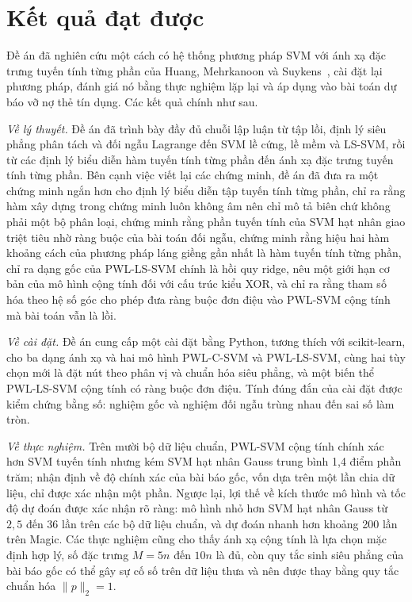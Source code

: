 
\section*{Kết quả đạt được}

Đề án đã nghiên cứu một cách có hệ thống phương pháp SVM với ánh xạ đặc trưng tuyến tính từng phần của Huang, Mehrkanoon và Suykens~\cite{huang2013}, cài đặt lại phương pháp, đánh giá nó bằng thực nghiệm lặp lại và áp dụng vào bài toán dự báo vỡ nợ thẻ tín dụng. Các kết quả chính như sau.

\emph{Về lý thuyết.} Đề án đã trình bày đầy đủ chuỗi lập luận từ tập lồi, định lý siêu phẳng phân tách và đối ngẫu Lagrange đến SVM lề cứng, lề mềm và LS-SVM, rồi từ các định lý biểu diễn hàm tuyến tính từng phần đến ánh xạ đặc trưng tuyến tính từng phần. Bên cạnh việc viết lại các chứng minh, đề án đã đưa ra một chứng minh ngắn hơn cho định lý biểu diễn tập tuyến tính từng phần, chỉ ra rằng hàm xây dựng trong chứng minh luôn không âm nên chỉ mô tả biên chứ không phải một bộ phân loại, chứng minh rằng phần tuyến tính của SVM hạt nhân giao triệt tiêu nhờ ràng buộc của bài toán đối ngẫu, chứng minh rằng hiệu hai hàm khoảng cách của phương pháp láng giềng gần nhất là hàm tuyến tính từng phần, chỉ ra dạng gốc của PWL-LS-SVM chính là hồi quy ridge, nêu một giới hạn cơ bản của mô hình cộng tính đối với cấu trúc kiểu XOR, và chỉ ra rằng tham số hóa theo hệ số góc cho phép đưa ràng buộc đơn điệu vào PWL-SVM cộng tính mà bài toán vẫn là lồi.

\emph{Về cài đặt.} Đề án cung cấp một cài đặt bằng Python, tương thích với scikit-learn, cho ba dạng ánh xạ và hai mô hình PWL-C-SVM và PWL-LS-SVM, cùng hai tùy chọn mới là đặt nút theo phân vị và chuẩn hóa siêu phẳng, và một biến thể PWL-LS-SVM cộng tính có ràng buộc đơn điệu. Tính đúng đắn của cài đặt được kiểm chứng bằng số: nghiệm gốc và nghiệm đối ngẫu trùng nhau đến sai số làm tròn.

\emph{Về thực nghiệm.} Trên mười bộ dữ liệu chuẩn, PWL-SVM cộng tính chính xác hơn SVM tuyến tính nhưng kém SVM hạt nhân Gauss trung bình 1{,}4 điểm phần trăm; nhận định về độ chính xác của bài báo gốc, vốn dựa trên một lần chia dữ liệu, chỉ được xác nhận một phần. Ngược lại, lợi thế về kích thước mô hình và tốc độ dự đoán được xác nhận rõ ràng: mô hình nhỏ hơn SVM hạt nhân Gauss từ $2{,}5$ đến $36$ lần trên các bộ dữ liệu chuẩn, và dự đoán nhanh hơn khoảng 200 lần trên Magic. Các thực nghiệm cũng cho thấy ánh xạ cộng tính là lựa chọn mặc định hợp lý, số đặc trưng $M=5n$ đến $10n$ là đủ, còn quy tắc sinh siêu phẳng của bài báo gốc có thể gây sự cố số trên dữ liệu thưa và nên được thay bằng quy tắc chuẩn hóa $\|p\|_2=1$.

